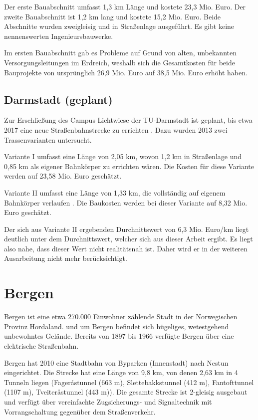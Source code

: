 Der erste Bauabschnitt umfasst 1,3 km Länge und kostete 23,3 Mio. Euro. Der
zweite Bauabschnitt ist 1,2 km lang und kostete 15,2 Mio. Euro. Beide Abschnitte
wurden zweigleisig und in Straßenlage ausgeführt. Es gibt keine nennenswerten
Ingenieursbauwerke.

Im ersten Bauabschnitt gab es Probleme auf Grund von alten, unbekannten
Versorgungsleitungen im Erdreich, weshalb sich die Gesamtkosten für beide
Bauprojekte von ursprünglich 26,9 Mio. Euro auf 38,5 Mio. Euro erhöht haben.

\subsection*{Darmstadt (geplant)}

Zur Erschließung des Campus Lichtwiese der TU-Darmstadt ist geplant, bis etwa
2017 eine neue Straßenbahnstrecke zu errichten \cite{mrDaLw}. Dazu wurden 2013
zwei Trassenvarianten untersucht.

Variante I umfasst eine Länge von 2,05 km, wovon 1,2 km in Straßenlage und 0,85
km als eigener Bahnkörper zu errichten wären. Die Kosten für diese Variante
werden auf 23,58 Mio.  Euro geschätzt.

Variante II umfasst eine Länge von 1,33 km, die vollständig auf eigenem
Bahnkörper verlaufen \cite{eoDaLw}.  Die Baukosten werden bei dieser Variante
auf 8,32 Mio. Euro geschätzt.

Der sich aus Variante II ergebenden Durchnittswert von 6,3 Mio. Euro/km liegt
deutlich unter dem Durchnittswert, welcher sich aus dieser Arbeit ergibt. Es
liegt also nahe, dass dieser Wert nicht realitätsnah ist. Daher wird er in der
weiteren Ausarbeitung nicht mehr berücksichtigt.

\section{Bergen}

Bergen ist eine etwa 270.000 Einwohner zählende Stadt in der Norwegischen
Provinz Hordaland.  und um Bergen befindet sich hügeliges, wetestgehend
unbewohntes Gelände. Bereits von 1897 bis 1966 verfügte Bergen über eine
elektrische Straßenbahn.

Bergen hat 2010 eine Stadtbahn von Byparken (Innenstadt) nach Nestun
eingerichtet. Die Strecke hat eine Länge von 9,8 km, von denen 2,63 km in 4
Tunneln liegen (Fageråstunnel (663 m), Slettebakkstunnel (412 m), Fantofttunnel
(1107 m), Tveiteråstunnel (443 m)). Die gesamte Strecke ist 2-gleisig ausgebaut
und verfügt über vereinfachte Zugsicherungs- und Signaltechnik mit
Vorrangschaltung gegenüber dem Straßenverkehr.

